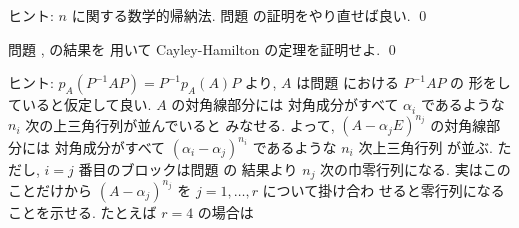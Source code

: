 \documentclass[12pt,twoside]{jarticle}
\begin{document}
\noindent
ヒント: $n$ に関する数学的帰納法. 
問題  の証明をやり直せば良い.
\qed


\begin{question}
  問題 ,  の結果を
  用いて Cayley-Hamilton の定理を証明せよ. \qed
\end{question}

\noindent
ヒント: $p_A(P^{-1}AP)=P^{-1}p_A(A)P$ より, 
$A$ は問題  における $P^{-1}AP$ の
形をしていると仮定して良い.  $A$ の対角線部分には
対角成分がすべて $\alpha_i$ であるような $n_i$ 次の上三角行列が並んでいると
みなせる.  よって, $(A-\alpha_j E)^{n_j}$ の対角線部分には
対角成分がすべて $(\alpha_i-\alpha_j)^{n_i}$ であるような $n_i$ 次上三角行列
が並ぶ.  ただし, $i=j$ 番目のブロックは問題  の
結果より $n_j$ 次の巾零行列になる.  
実はこのことだけから $(A-\alpha_j)^{n_j}$ を $j=1,\dots,r$ について掛け合わ
せると零行列になることを示せる.  たとえば $r=4$ の場合は
\end{document}
